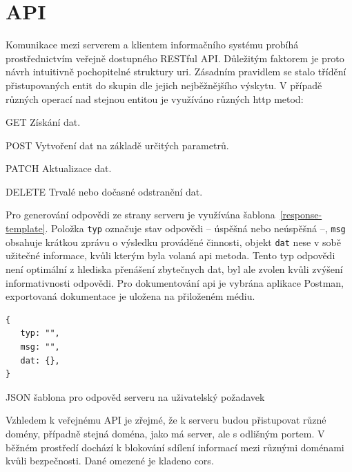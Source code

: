 

\section{API}

Komunikace mezi serverem a klientem informačního systému probíhá prostřednictvím veřejně dostupného RESTful API. Důležitým faktorem je proto návrh intuitivně pochopitelné struktury \gls{uri}. Zásadním pravidlem se stalo třídění přistupovaných entit do skupin dle jejich nejběžnějšího výskytu. V případě různých operací nad stejnou entitou je využíváno různých \gls{http} metod:
\begin{dlnar}
   \item [GET] Získání dat.
   \item [POST] Vytvoření dat na základě určitých parametrů.
   \item [PATCH] Aktualizace dat.
   \item [DELETE] Trvalé nebo dočasné odstranění dat.
\end{dlnar}


Pro generování odpovědi ze strany serveru je využívána šablona~\ref{response-template}. Položka \texttt{typ} označuje stav odpovědi -- úspěšná nebo neúspěšná --, \texttt{msg} obsahuje krátkou zprávu o výsledku prováděné činnosti, objekt \texttt{dat} nese v sobě užitečné informace, kvůli kterým byla volaná \gls{api} metoda. Tento typ odpovědi není optimální z hlediska přenášení zbytečnych dat, byl ale zvolen kvůli zvýšení informativnosti odpovědi. Pro dokumentování \gls{api} je vybrána aplikace Postman, exportovaná dokumentace je uložena na přiloženém médiu.


\begin{fig:code}
   \begin{verbatim}   
{
   typ: "",
   msg: "",
   dat: {},
}
   \end{verbatim}
   \caption{JSON šablona pro odpověd serveru na uživatelský požadavek}\label{response-template}
\end{fig:code}



Vzhledem k veřejnému API je zřejmé, že k serveru budou přistupovat různé domény, případně stejná doména, jako má server, ale s odlišným portem. V běžném prostředí dochází k blokování sdílení informací mezi různými doménami kvůli bezpečnosti. Dané omezené je kladeno \gls{cors}.~\cite{corsActions}

